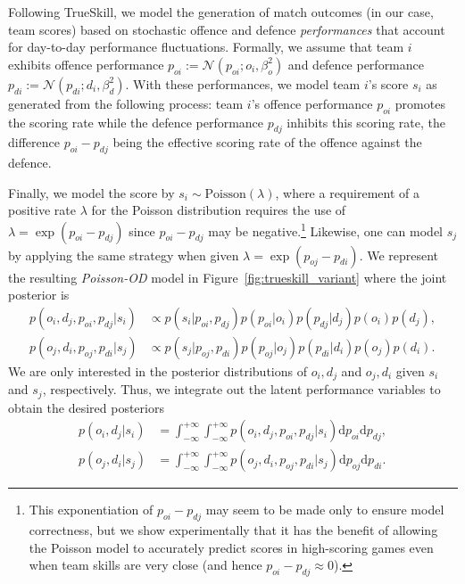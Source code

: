 Following TrueSkill, we model the generation of match outcomes
(in our case, team scores) based on stochastic offence and defence
\emph{performances} that account for day-to-day performance
fluctuations. Formally, we assume that team $i$ exhibits offence performance
$p_{oi}:=\mathcal{N}(p_{oi}; o_i, \beta_o^2)$ and defence performance
$p_{di}:=\mathcal{N}(p_{di}; d_i, \beta_d^2)$. With these
performances, we model team $i$'s score $s_i$ as generated from the
following process: team $i$'s offence performance $p_{oi}$ promotes
the scoring rate while the defence performance $p_{dj}$ inhibits this
scoring rate, the difference $p_{oi}-p_{dj}$ being the effective
scoring rate of the offence against the defence.

Finally, we model the score by $s_{i}\sim\text{Poisson}(\lambda)$,
where a requirement of a positive rate $\lambda$ for the Poisson distribution
requires the use of $\lambda = \exp(p_{oi}-p_{dj})$ since
$p_{oi}-p_{dj}$ may be negative.\footnote{This exponentiation of
$p_{oi}-p_{dj}$ may seem to be made only to ensure model correctness,
but we show experimentally that it has the benefit of
allowing the Poisson model to accurately predict scores in
high-scoring games even when team skills are very close (and hence
$p_{oi}-p_{dj} \approx 0$).}  Likewise, one can model $s_j$ by
applying the same strategy when given $\lambda = \exp(p_{oj} - p_{di})$.
We represent the resulting \emph{Poisson-OD}
model in Figure~\ref{fig:trueskill_variant} where the joint posterior
is
\begin{align}%
    p(o_i, d_j, p_{oi},p_{dj} | s_i) & \propto p(s_i|p_{oi},p_{dj}) p(p_{oi}|o_i) p(p_{dj}|d_j) p(o_i)p(d_j), \nonumber \\
    p(o_j, d_i, p_{oj},p_{di} | s_j) & \propto p(s_j|p_{oj},p_{di}) p(p_{oj}|o_j) p(p_{di}|d_i) p(o_j)p(d_i). \nonumber
\end{align}
We are only interested in the posterior distributions of $o_i,d_j$ and
$o_j,d_i$ given $s_i$ and $s_j$, respectively. Thus, we integrate
out the latent performance variables to obtain the desired posteriors
\begin{align} %
    p(o_i, d_j | s_i) &= \int_{-\infty}^{+\infty} \int_{-\infty}^{+\infty} p(o_i, d_j, p_{oi},p_{dj} | s_i)  \mathrm{d}p_{oi}\mathrm{d}p_{dj}, \nonumber \\
    p(o_j, d_i | s_j) &= \int_{-\infty}^{+\infty} \int_{-\infty}^{+\infty} p(o_j, d_i, p_{oj},p_{di} | s_j)  \mathrm{d}p_{oj}\mathrm{d}p_{di}. \nonumber
\end{align}
